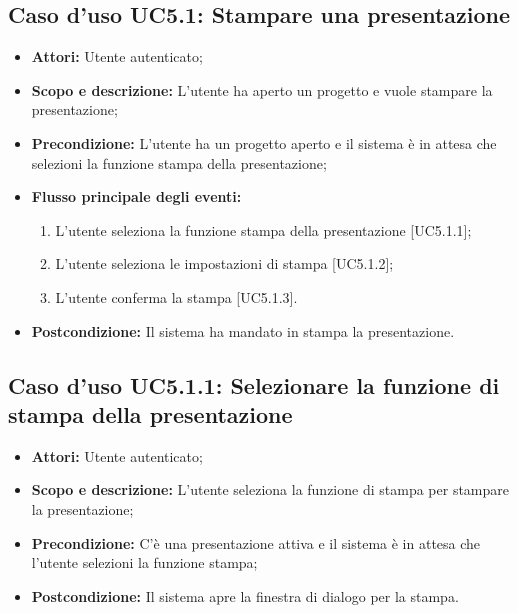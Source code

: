 	\subsection{Caso d'uso UC5.1: Stampare una presentazione}
	\begin{itemize}
		\item \textbf{Attori:} Utente autenticato;
		\item \textbf{Scopo e descrizione:} L'utente ha aperto un progetto e vuole stampare la presentazione;
		\item \textbf{Precondizione:} L'utente ha un progetto aperto e il sistema è in attesa che selezioni la funzione stampa della presentazione;
		\item \textbf{Flusso principale degli eventi:}
		\begin{enumerate}
			\item L'utente seleziona la funzione stampa della presentazione [UC5.1.1];
			\item L'utente seleziona le impostazioni di stampa [UC5.1.2];
			\item L'utente conferma la stampa [UC5.1.3].
		\end{enumerate}
		\item \textbf{Postcondizione:} Il sistema ha mandato in stampa la presentazione.
	\end{itemize}
	
	\subsection{Caso d'uso UC5.1.1: Selezionare la funzione di stampa della presentazione}
	\begin{itemize}
		\item \textbf{Attori:} Utente autenticato;
		\item \textbf{Scopo e descrizione:} L'utente seleziona la funzione di stampa per stampare la presentazione;
		\item \textbf{Precondizione:} C'è una presentazione attiva e il sistema è in attesa che l'utente selezioni la funzione stampa;
		\item \textbf{Postcondizione:} Il sistema apre la finestra di dialogo per la stampa.
	\end{itemize}
	
